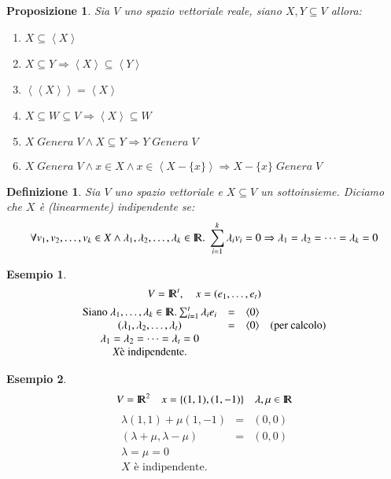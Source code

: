 \documentclass[12pt,a4paper]{article}
\theoremstyle{break}
\newtheorem{definition}{Definizione}[subsection]
\newtheorem{proposition}{Proposizione}[subsection]
\newtheorem{example}{Esempio}[subsection]
\newcommand\R{{\rm I\!R}}
\newcommand\CombSet[1]{\left< #1 \right>}
\begin{document}
    \begin{proposition}
        Sia $V$ uno spazio vettoriale reale, siano $X,Y\subseteq V$ allora:
        \begin{enumerate}
            \item $X \subseteq\CombSet{X}$
            \item $X\subseteq Y \Rightarrow \CombSet{X}\subseteq \CombSet{Y}$
            \item $\CombSet{\CombSet{X}}  = \CombSet{X}$
            \item $X\subseteq W \subseteq V \Rightarrow \CombSet{X}\subseteq W$
            \item $X\; Genera\;V \wedge X\subseteq Y \Rightarrow Y\; Genera\; V$
            \item $X\; Genera\; V\wedge x\in X\wedge x\in\CombSet{X-\{x\}}\Rightarrow X-\{x\}\; Genera\; V$
        \end{enumerate}
    \end{proposition}
    \begin{definition}
        Sia $V$ uno spazio vettoriale e $X\subseteq V$ un sottoinsieme.\newline
        Diciamo che $X$ è (linearmente) indipendente se:
        \[
            \forall v_1,v_2,\dots ,v_k\in X\wedge\lambda_1,\lambda_2,\dots , \lambda_k\in\R .\; \sum_{i=1}^k \lambda_iv_i = 0 \Rightarrow \lambda_1=\lambda_2=\dots = \lambda_k = 0
        \]
    \end{definition}
    \newpage
    \begin{example}
        \[V = \R^t,\quad x= (e_1,\dots ,e_t)\]
        \[
            \begin{matrix}
                \text{Siano } \lambda_1,\dots ,\lambda_k\in\R . \sum_{i=1}^t \lambda_ie_i & = & \langle 0 \rangle \\
                (\lambda_1, \lambda_2, \dots, \lambda_t) & = & \langle 0 \rangle & (\text{per calcolo}) \\
                \lambda_1 = \lambda_2 = \dots = \lambda_t = 0 \\
                X \text{è indipendente.}
            \end{matrix}
        \]
    \end{example}
    \begin{example}
        \[V = \R^2\quad x = \{(1,1),(1,-1)\}\quad\lambda,\mu\in\R\]
        \[
            \begin{matrix}
                \lambda (1,1)+\mu (1,-1) & = & (0,0) \\
                (\lambda + \mu, \lambda - \mu) & = & (0,0) \\
                \lambda = \mu = 0 \\
                X \text{ è indipendente.}
            \end{matrix}
        \]
    \end{example}
\end{document}
